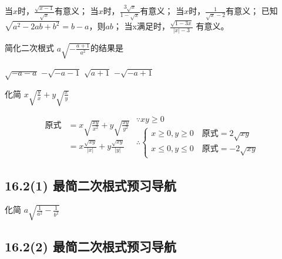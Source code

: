 \documentclass[answers]{exam}
\begin{document}
\begin{questions}

\question
当$x$\fillin[$ \ge 1$]时，$\frac{\sqrt{x-1}}{\sqrt{x}}$有意义；
当$x$\fillin[$\ne 1 \mbox{且} x \ge 0$]时，$\frac{3\sqrt{x}}{1-\sqrt{x}}$有意义；
当$x$\fillin[$\ge 0 \mbox{且} x \ne 4$]时，$\frac{1}{\sqrt{x}-2}$有意义；
已知$\sqrt{a^2-2ab+b^2}=b-a$，则$a$\fillin[$\le$]$b$；
当x满足时，$\frac{\sqrt{1-3x}}{| x | - 3} $ 有意义。

\question
简化二次根式 $a\sqrt{-\frac{a+1}{a^2}}$的结果是\fillin

  \begin{choices}
  \choice $\sqrt{-a-a}$
  \correctchoice $-\sqrt{-a-1}$
  \choice $\sqrt{a+1}$
  \choice $-\sqrt{-a+1}$
  \end{choices}
    
\question 化简 $x \sqrt{\frac{y}{x}} + y \sqrt{\frac{x}{y}}$

\begin{solution}
  \[
    \begin{aligned}
      \mbox{原式}
      & = x \sqrt{\frac{xy}{x^2}} + y \sqrt{\frac{xy}{y^2}} \\
      & = x \frac{\sqrt{xy}}{|x|} + y \frac{\sqrt{xy}}{|y|}
    \end{aligned}
      \begin{split}
      \because xy \ge 0 \\
      \therefore
      \begin{cases}
        x \ge 0, y \ge 0 \quad \mbox{原式} = 2 \sqrt{xy} \\
        x \le 0, y \le 0 \quad \mbox{原式} = - 2 \sqrt{xy}
      \end{cases}
    \end{split} 
\]
\end{solution}  

\end{questions}

\subsection{16.2(1) 最简二次根式预习导航}

\begin{questions}
  
\question 化简 $a\sqrt{\frac{1}{a^2}-\frac{1}{b^2}}$

\end{questions}

\subsection{16.2(2) 最简二次根式预习导航}
\end{document}
